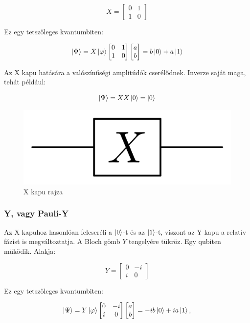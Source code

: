 \documentclass[
]{thesis-ekf}
\theoremstyle{definition}
\theoremstyle{remark}
\begin{document}
\begin{equation}
	X= 
	\begin{bmatrix}
		0 & 1\\
		1 & 0
	\end{bmatrix}
\end{equation}

Ez egy tetszőleges kvantumbiten:

\begin{equation}
	\ket{\Psi}=X\ket{\varphi}
		\begin{bmatrix}
			0 & 1\\
			1 & 0
		\end{bmatrix}
		\begin{bmatrix}
			a\\
			b
		\end{bmatrix}=b\ket{0}+a\ket{1}
\end{equation}


Az X kapu hatására a valószínűségi amplitúdók cserélődnek. Inverze saját maga, tehát például:

\begin{equation}
	\ket{\Psi}=XX\ket{0}=\ket{0}
\end{equation}

\begin{figure}[H]
	\centering
	\includegraphics[width=0.3\linewidth]{Pauli_X}
	\caption{X kapu rajza}
	\label{fig:paulix}
\end{figure}


\subsubsection{Y, vagy Pauli-Y}
Az X kapuhoz hasonlóan felcseréli a $\ket{0}$-t és az $\ket{1}$-t, viszont az Y kapu a relatív fázist is megváltoztatja. A Bloch gömb $Y$ tengelyére tükröz. Egy qubiten működik. Alakja:

\begin{equation}
	Y= 
	\begin{bmatrix}
		0 & -i\\
		i & 0
	\end{bmatrix}
\end{equation}

Ez egy tetszőleges kvantumbiten:

\begin{equation}
	\ket{\Psi}=Y\ket{\varphi}
		\begin{bmatrix}
			0 & -i\\
			i & 0
		\end{bmatrix}
		\begin{bmatrix}
			a\\
			b
		\end{bmatrix}=-ib\ket{0}+ia\ket{1},
\end{equation}
\end{document}
